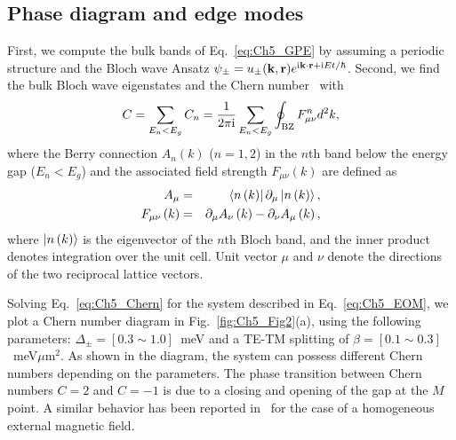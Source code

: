

\subsection{Phase diagram and edge modes}
First, we compute the bulk bands of Eq.~\eqref{eq:Ch5_GPE} by assuming a periodic structure and the Bloch wave Ansatz $\psi_{\pm} = u_{\pm}(\mathbf{k},\mathbf{r}) e^{\mathrm{i} \mathbf{k}\cdot \mathbf{r} + \mathrm{i} E t/\hbar}$.
Second, we find the bulk Bloch wave eigenstates and the Chern number~\cite{Fukui:2005aa} with
%
\begin{equation}
C =  \sum_{E_n < E_g} C_n = \frac{1}{2\pi \mathrm{i}}\sum_{E_n < E_g} \oint_{\mathrm{BZ}}F_{\mu\nu}^n d^2k,
\label{eq:Ch5_Chern}
\end{equation}
%
where the Berry connection $A_n\left(k\right)$ ($n = 1,2$) in the $n$th band below the energy gap ($E_n<E_g$) and the associated field strength $F_{\mu\nu}\left(k\right)$ are defined as
%
\begin{eqnarray}
    A_\mu &=& \bra{n\left(k\right)}\partial_\mu\ket{n \left(k\right)},\nonumber \\
    F_{\mu\nu}\left(k\right) &=& \partial_\mu A_\nu\left(k\right) - \partial_\nu A_\mu\left(k\right),
\end{eqnarray}
%
where $\ket{n\left(k\right)} $ is the eigenvector of the $n$th Bloch band, and the inner product denotes integration over the unit cell.
Unit vector $\mu$ and $\nu$ denote the directions of the two reciprocal lattice vectors.

Solving Eq.~\eqref{eq:Ch5_Chern} for the system described in Eq.~\eqref{eq:Ch5_EOM}, we plot a Chern number diagram in Fig.~\ref{fig:Ch5_Fig2}(a), using the following parameters: $\Delta_\pm=\left[0.3\sim1.0\right]$~meV and a TE-TM splitting of $\beta = \left[ 0.1\sim0.3\right] $~meV$\mu$m$^{2}$.
As shown in the diagram, the system can possess different Chern numbers depending on the parameters. The phase transition between Chern numbers $C=2$ and $C=-1$ is due to a closing and opening of the gap at the $M$ point.
A similar behavior has been reported in~\cite{Bleu:2017aa} for the case of a homogeneous external magnetic field.

